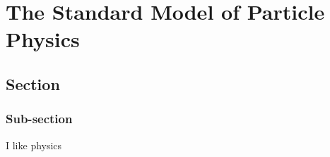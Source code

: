 
\chapter{The Standard Model of Particle Physics}
\section{Section}
\subsection{Sub-section}
\cite{Stewart-Tackmann:2012}

I like physics